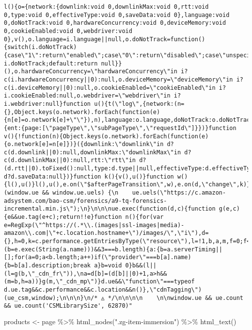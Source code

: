 \documentclass[
]{article}
\newenvironment{Shaded}{\begin{snugshade}}{\end{snugshade}}
\newcommand{\FunctionTok}[1]{\textcolor[rgb]{0.00,0.00,0.00}{#1}}
\newcommand{\NormalTok}[1]{#1}
\newcommand{\OtherTok}[1]{\textcolor[rgb]{0.56,0.35,0.01}{#1}}
\newcommand{\SpecialCharTok}[1]{\textcolor[rgb]{0.00,0.00,0.00}{#1}}
\newcommand{\StringTok}[1]{\textcolor[rgb]{0.31,0.60,0.02}{#1}}
\begin{document}
\begin{verbatim}
l(){o={network:{downlink:void 0,downlinkMax:void 0,rtt:void 0,type:void 0,effectiveType:void 0,saveData:void 0},language:void 0,doNotTrack:void 0,hardwareConcurrency:void 0,deviceMemory:void 0,cookieEnabled:void 0,webdriver:void 0},v(),o.language=i.language||null,o.doNotTrack=function(){switch(i.doNotTrack){case\"1\":return\"enabled\";case\"0\":return\"disabled\";case\"unspecified\":return i.doNotTrack;default:return null}}(),o.hardwareConcurrency=\"hardwareConcurrency\"in i?c(i.hardwareConcurrency||0):null,o.deviceMemory=\"deviceMemory\"in i?c(i.deviceMemory||0):null,o.cookieEnabled=\"cookieEnabled\"in i?i.cookieEnabled:null,o.webdriver=\"webdriver\"in i?i.webdriver:null}function u(){t(\"log\",{network:(n={},Object.keys(o.network).forEach(function(e){n[e]=o.network[e]+\"\"}),n),language:o.language,doNotTrack:o.doNotTrack,hardwareConcurrency:o.hardwareConcurrency,deviceMemory:o.deviceMemory,cookieEnabled:o.cookieEnabled,webdriver:o.webdriver,schemaId:r},{ent:{page:[\"pageType\",\"subPageType\",\"requestId\"]}})}function v(){!function(n){Object.keys(o.network).forEach(function(e){o.network[e]=n[e]})}({downlink:\"downlink\"in d?c(d.downlink||0):null,downlinkMax:\"downlinkMax\"in d?c(d.downlinkMax||0):null,rtt:\"rtt\"in d?(d.rtt||0).toFixed():null,type:d.type||null,effectiveType:d.effectiveType||null,saveData:\"saveData\"in d?d.saveData:null})}function k(){v(),u()}function w(){l(),u()}l(),u(),e.on(\"$afterPageTransition\",w),e.on(d,\"change\",k)});\nif (window.ue && window.ue.uels) {\n    ue.uels(\"https://c.amazon-adsystem.com/bao-csm/forensics/a9-tq-forensics-incremental.min.js\");\n}\n\n\nue.exec(function(d,c){function g(e,c){e&&ue.tag(e+c);return!!e}function n(){for(var e=RegExp(\"^https://(.*\\.(images|ssl-images|media)-amazon\\.com|\"+c.location.hostname+\")/images/\",\"i\"),d={},h=0,k=c.performance.getEntriesByType(\"resource\"),l=!1,b,a,m,f=0;f<k.length;f++)if(a=k[f],0<a.transferSize&&a.transferSize>=a.encodedBodySize&&(b=e.exec(String(a.name)))&&3===b.length){a:{b=a.serverTiming||[];for(a=0;a<b.length;a++)if(\"provider\"===b[a].name){b=b[a].description;break a}b=void 0}b&&(l||(l=g(b,\"_cdn_fr\")),\na=d[b]=(d[b]||0)+1,a>h&&(m=b,h=a))}g(m,\"_cdn_mp\")}d.ue&&\"function\"===typeof d.ue.tag&&c.performance&&c.location&&n()},\"cdnTagging\")(ue_csm,window);\n\n\n}\n/* ◬ */\n\n\n\n    \n\nwindow.ue && ue.count && ue.count('CSMLibrarySize', 62870)"
\end{verbatim}

\begin{Shaded}
\begin{Highlighting}[]
\NormalTok{products }\OtherTok{\textless{}{-}}\NormalTok{ page }\SpecialCharTok{\%\textgreater{}\%}
  \FunctionTok{html\_nodes}\NormalTok{(}\StringTok{".zg{-}item{-}immersion"}\NormalTok{) }\SpecialCharTok{\%\textgreater{}\%}
  \FunctionTok{html\_text}\NormalTok{()}
\end{Highlighting}
\end{Shaded}
\end{document}
